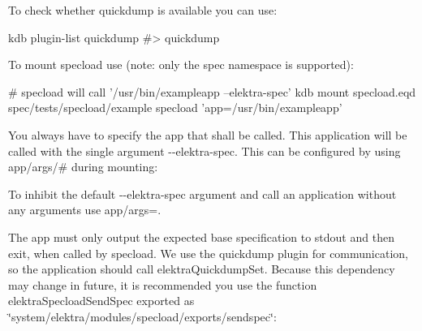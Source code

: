 To check whether {\ttfamily quickdump} is available you can use\+:


\begin{DoxyCode}
kdb plugin-list quickdump
#> quickdump
\end{DoxyCode}


To mount {\ttfamily specload} use (note\+: only the {\ttfamily spec} namespace is supported)\+:


\begin{DoxyCode}
# specload will call '/usr/bin/exampleapp --elektra-spec'
kdb mount specload.eqd spec/tests/specload/example specload 'app=/usr/bin/exampleapp'
\end{DoxyCode}


You always have to specify the {\ttfamily app} that shall be called. This application will be called with the single argument {\ttfamily -\/-\/elektra-\/spec}. This can be configured by using {\ttfamily app/args/\#} during mounting\+:




To inhibit the default {\ttfamily -\/-\/elektra-\/spec} argument and call an application without any arguments use {\ttfamily \textquotesingle{}app/args=\textquotesingle{}}.

The app must only output the expected base specification to {\ttfamily stdout} and then exit, when called by {\ttfamily specload}. We use the {\ttfamily quickdump} plugin for communication, so the application should call {\ttfamily elektra\+Quickdump\+Set}. Because this dependency may change in future, it is recommended you use the function {\ttfamily elektra\+Specload\+Send\+Spec} exported as {\ttfamily \char`\"{}system/elektra/modules/specload/exports/sendspec\char`\"{}}\+:



